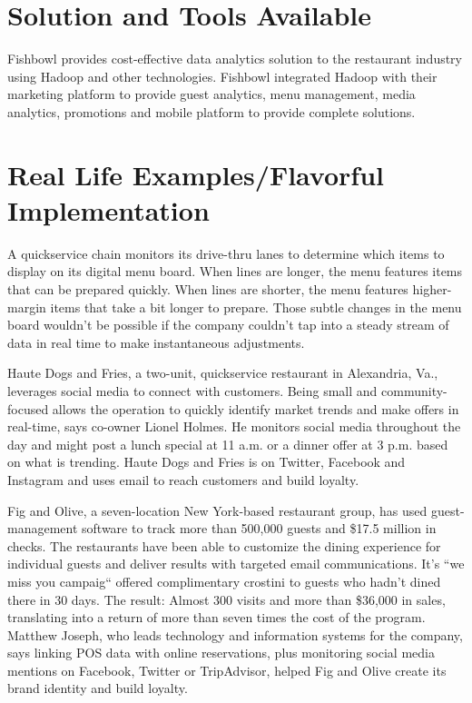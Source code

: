 \documentclass[sigconf]{acmart}
\begin{document}
\section{Solution and Tools Available}
Fishbowl provides cost-effective data analytics solution to the restaurant industry using Hadoop and other technologies. Fishbowl integrated Hadoop with their marketing platform to provide guest analytics, menu management, media analytics, promotions and mobile platform to provide complete solutions.\cite{www-foodnewsfeed}\cite{www-fishbowl}

\section{Real Life Examples/Flavorful Implementation}
A quickservice chain monitors its drive-thru lanes to determine which items to display on its digital menu board. When lines are longer, the menu features items that can be prepared quickly. When lines are shorter, the menu features higher-margin items that take a bit longer to prepare. Those subtle changes in the menu board wouldn't be possible if the company couldn't tap into a steady stream of data in real time to make instantaneous adjustments.\cite{www-restaurant}


Haute Dogs and Fries, a two-unit, quickservice restaurant in Alexandria, Va., leverages social media to connect with customers. Being small and community-focused allows the operation to quickly identify market trends and make offers in real-time, says co-owner Lionel Holmes. He monitors social media throughout the day and might post a lunch special at 11 a.m. or a dinner offer at 3 p.m. based on what is trending. Haute Dogs and Fries is on Twitter, Facebook and Instagram and uses email to reach customers and build loyalty.\cite{www-restaurant}


Fig and Olive, a seven-location New York-based restaurant group, has used guest-management software to track more than 500,000 guests and \$17.5 million in checks. The restaurants have been able to customize the dining experience for individual guests and deliver results with targeted email communications. It's ``we miss you campaig`` offered complimentary crostini to guests who hadn't dined there in 30 days. The result: Almost 300 visits and more than \$36,000 in sales, translating into a return of more than seven times the cost of the program. Matthew Joseph, who leads technology and information systems for the company, says linking POS data with online reservations, plus monitoring social media mentions on Facebook, Twitter or TripAdvisor, helped Fig and Olive create its brand identity and build loyalty.\cite{www-restaurant}
\end{document}
